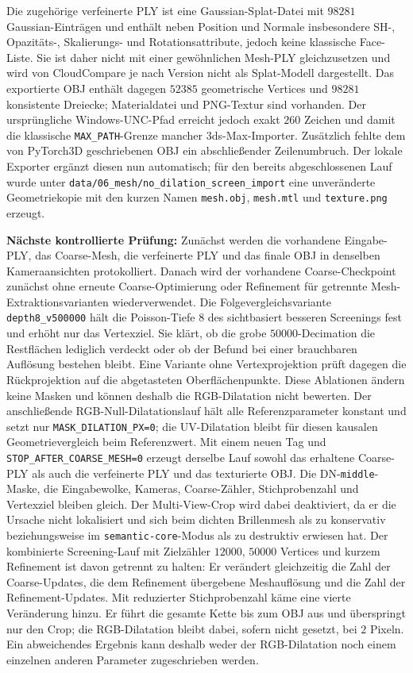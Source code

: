 \documentclass[12pt,a4paper]{article}
\begin{document}
Die zugehörige verfeinerte PLY ist eine Gaussian-Splat-Datei mit $98281$ Gaussian-Einträgen und enthält neben Position und Normale insbesondere SH-, Opazitäts-, Skalierungs- und Rotationsattribute, jedoch keine klassische Face-Liste. Sie ist daher nicht mit einer gewöhnlichen Mesh-PLY gleichzusetzen und wird von CloudCompare je nach Version nicht als Splat-Modell dargestellt. Das exportierte OBJ enthält dagegen $52385$ geometrische Vertices und $98281$ konsistente Dreiecke; Materialdatei und PNG-Textur sind vorhanden. Der ursprüngliche Windows-UNC-Pfad erreicht jedoch exakt $260$ Zeichen und damit die klassische \texttt{MAX\_PATH}-Grenze mancher 3ds-Max-Importer. Zusätzlich fehlte dem von PyTorch3D geschriebenen OBJ ein abschließender Zeilenumbruch. Der lokale Exporter ergänzt diesen nun automatisch; für den bereits abgeschlossenen Lauf wurde unter \texttt{data/06\_mesh/no\_dilation\_screen\_import} eine unveränderte Geometriekopie mit den kurzen Namen \texttt{mesh.obj}, \texttt{mesh.mtl} und \texttt{texture.png} erzeugt.

\textbf{Nächste kontrollierte Prüfung:} Zunächst werden die vorhandene Eingabe-PLY, das Coarse-Mesh, die verfeinerte PLY und das finale OBJ in denselben Kameraansichten protokolliert. Danach wird der vorhandene Coarse-Checkpoint zunächst ohne erneute Coarse-Optimierung oder Refinement für getrennte Mesh-Extraktionsvarianten wiederverwendet. Die Folgevergleichsvariante \texttt{depth8\_v500000} hält die Poisson-Tiefe $8$ des sichtbasiert besseren Screenings fest und erhöht nur das Vertexziel. Sie klärt, ob die grobe $50000$-Decimation die Restflächen lediglich verdeckt oder ob der Befund bei einer brauchbaren Auflösung bestehen bleibt. Eine Variante ohne Vertexprojektion prüft dagegen die Rückprojektion auf die abgetasteten Oberflächenpunkte. Diese Ablationen ändern keine Masken und können deshalb die RGB-Dilatation nicht bewerten. Der anschließende RGB-Null-Dilatationslauf hält alle Referenzparameter konstant und setzt nur \texttt{MASK\_DILATION\_PX=0}; die UV-Dilatation bleibt für diesen kausalen Geometrievergleich beim Referenzwert. Mit einem neuen Tag und \texttt{STOP\_AFTER\_COARSE\_MESH=0} erzeugt derselbe Lauf sowohl das erhaltene Coarse-PLY als auch die verfeinerte PLY und das texturierte OBJ. Die DN-\texttt{middle}-Maske, die Eingabewolke, Kameras, Coarse-Zähler, Stichprobenzahl und Vertexziel bleiben gleich. Der Multi-View-Crop wird dabei deaktiviert, da er die Ursache nicht lokalisiert und sich beim dichten Brillenmesh als zu konservativ beziehungsweise im \texttt{semantic-core}-Modus als zu destruktiv erwiesen hat. Der kombinierte Screening-Lauf mit Zielzähler $12000$, $50000$ Vertices und kurzem Refinement ist davon getrennt zu halten: Er verändert gleichzeitig die Zahl der Coarse-Updates, die dem Refinement übergebene Meshauflösung und die Zahl der Refinement-Updates. Mit reduzierter Stichprobenzahl käme eine vierte Veränderung hinzu. Er führt die gesamte Kette bis zum OBJ aus und überspringt nur den Crop; die RGB-Dilatation bleibt dabei, sofern nicht gesetzt, bei $2$ Pixeln. Ein abweichendes Ergebnis kann deshalb weder der RGB-Dilatation noch einem einzelnen anderen Parameter zugeschrieben werden.
\end{document}
